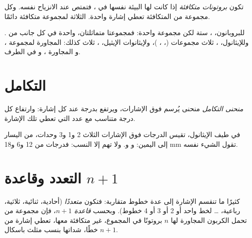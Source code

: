 \begin{definition}\label{def:g12:proton-nmr:equivalent}
تكون  \emph{بروتونات متكافئة} إذا كانت
لها البيئة نفسها في ، فتمتص عند
الانزياح نفسه. وكل مجموعة من  المتكافئة تعطي إشارة واحدة. 
الثلاثة لمجموعة  متكافئة دائمًا.
\end{definition}

\begin{example}[عدّ المجموعات]\label{ex:g12:proton-nmr:groups}
للبروبانون، ، ستة  لكن مجموعة واحدة: فمجموعتا
 متماثلتان، واحدة في كل جانب من . وللإيثانول،
، ثلاث مجموعات (، ، )، ولإيثانوات
الإيثيل، ، ثلاث كذلك: 
المجاورة لمجموعة ، و المجاورة  ، و في
الطرف.
\end{example}

\section{التكامل}

\begin{definition}\label{def:g12:proton-nmr:integration}
\emph{منحنى التكامل} 
منحنى يُرسم فوق الإشارات، ويرتفع بدرجة عند كل إشارة:
وارتفاع كل درجة متناسب مع عدد  التي
تعطي تلك الإشارة.
\end{definition}

\begin{example}\label{ex:g12:proton-nmr:steps}
في طيف الإيثانول، تقيس الدرجات فوق الإشارات الثلاث 2 و1
و3 وحدات، من اليسار إلى اليمين:  و و. ولا تهم إلا
النسب: فدرجات من 12 و6 و18 mm تقول الشيء نفسه.
\end{example}

\section{التعدد وقاعدة \texorpdfstring{$n+1$}{n+1}}


\begin{definition}\label{def:g12:proton-nmr:multiplet}
كثيرًا ما تنقسم الإشارة إلى عدة خطوط متقاربة: فتكون \emph{متعددًا}
(أحادية، ثنائية، ثلاثية، رباعية، \dots{} لخط واحد أو 2 أو 3 أو 4 خطوط). وبحسب
\emph{قاعدة $n+1$}، فإن مجموعة من 
تحمل  الكربون المجاورة لها $n$ بروتونًا في المجموع، غير متكافئة
معها، تعطي إشارة من $n+1$ خطًا، شداتها بنسب
مثلث باسكال.
\end{definition}

